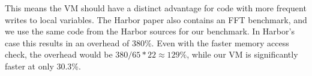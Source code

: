 This means the VM should have a distinct advantage for code with more frequent writes to local variables. The Harbor paper also contains an FFT benchmark, and we use the same code from the Harbor sources for our  benchmark. In Harbor's case this results in an overhead of 380\%. Even with the faster memory access check, the overhead would be $380 / 65 * 22 \approx 129\%$, while our VM is significantly faster at only 30.3\%.
